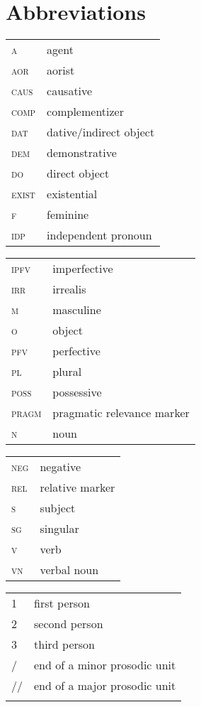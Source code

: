 \documentclass[output=paper]{langsci/langscibook}
\begin{document}
\section*{Abbreviations}
\begin{tabularx}{.45\textwidth}{lQ}
{\textsc{a}}		& agent \\
{\textsc{aor}}		& aorist \\
{\textsc{caus}}	& causative \\
{\textsc{comp}}	& complementizer \\
{\textsc{dat}}		& dative/indirect object \\
{\textsc{dem}}		& demonstrative \\
{\textsc{do}}		& direct object \\
{\textsc{exist}}		& existential \\
{\textsc{f}}		& feminine \\
{\textsc{idp}}		& independent pronoun\\
\end{tabularx}
\begin{tabularx}{.45\textwidth}{lQ}
{\textsc{ipfv}}		& imperfective \\
{\textsc{irr}}		& irrealis \\
{\textsc{m}}		& masculine \\
{\textsc{o}}		& object \\
{\textsc{pfv}}		& perfective \\
{\textsc{pl}}		& plural \\
{\textsc{poss}}	& possessive \\
{\textsc{pragm}}	& pragmatic relevance marker \\
{\textsc{n}}		& noun \\
\end{tabularx}

\begin{tabularx}{.45\textwidth}{lQ}
{\textsc{neg}}		& negative \\
{\textsc{rel}}		& relative marker \\
{\textsc{s}}		& subject \\
{\textsc{sg}}		& singular \\
{\textsc{v}}		& verb \\
{\textsc{vn}}		& verbal noun \\
\end{tabularx}
\begin{tabularx}{.45\textwidth}{lQ}
1		& first person \\
2 		& second person \\
3		& third person \\
/		& end of a minor prosodic unit \\
//		& end of a major prosodic unit \\
\\
\end{tabularx}



{\sloppy\printbibliography[heading=subbibliography,notkeyword=this]}
\end{document}
